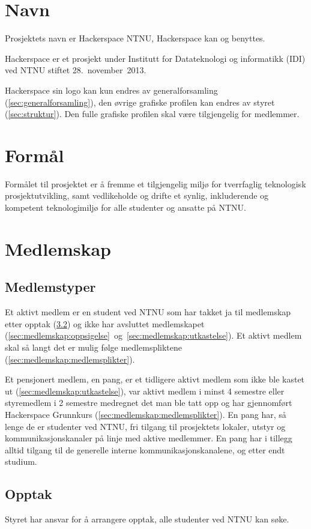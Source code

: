 \section{Navn}\label{sec:navn}
Prosjektets navn er Hackerspace NTNU, Hackerspace kan og benyttes.

Hackerspace er et prosjekt under Institutt for Datateknologi og informatikk (IDI) ved NTNU stiftet 28.~november~2013.

Hackerspace sin logo kan kun endres av generalforsamling (\ref{sec:generalforsamling}), den øvrige grafiske profilen kan endres av styret (\ref{sec:struktur}). Den fulle grafiske profilen skal være tilgjengelig for medlemmer.


\section{Formål}\label{sec:formål}
Formålet til prosjektet er å fremme et tilgjengelig miljø for tverrfaglig teknologisk prosjektutvikling, samt vedlikeholde og drifte et synlig, inkluderende og kompetent teknologimiljø for alle studenter og ansatte på NTNU.\@


\section{Medlemskap}\label{sec:medlemskap}
\subsection{Medlemstyper}\label{sec:medlemskap:medlemstyper}
Et aktivt medlem er en student ved NTNU som har takket ja til medlemskap etter opptak (\ref{sec:medlemskap:opptak}) og ikke har avsluttet medlemskapet (\ref{sec:medlemskap:oppsigelse}~og~\ref{sec:medlemskap:utkastelse}).
Et aktivt medlem skal så langt det er mulig følge medlemspliktene (\ref{sec:medlemskap:medlemsplikter}).

Et pensjonert medlem, en pang, er et tidligere aktivt medlem som ikke ble kastet ut (\ref{sec:medlemskap:utkastelse}), var aktivt medlem i minst 4 semestre eller styremedlem i 2 semestre medregnet det man ble tatt opp og har gjennomført Hackerspace Grunnkurs (\ref{sec:medlemskap:medlemsplikter}).
En pang har, så lenge de er studenter ved NTNU, fri tilgang til prosjektets lokaler, utstyr og kommunikasjonskanaler på linje med aktive medlemmer.
En pang har i tillegg alltid tilgang til de generelle interne kommunikasjonskanalene, og etter endt studium.

\subsection{Opptak}\label{sec:medlemskap:opptak}
Styret har ansvar for å arrangere opptak, alle studenter ved NTNU kan søke.


